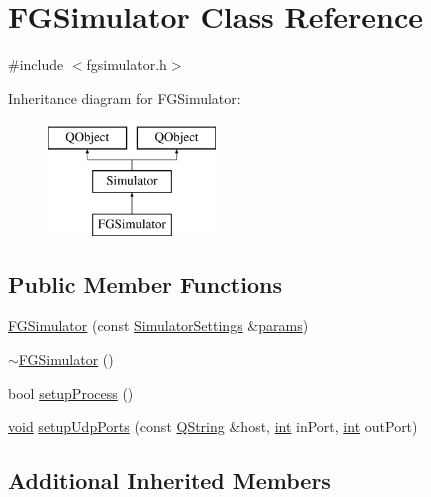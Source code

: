 \hypertarget{class_f_g_simulator}{\section{F\-G\-Simulator Class Reference}
\label{class_f_g_simulator}
}


{\ttfamily \#include $<$fgsimulator.\-h$>$}

Inheritance diagram for F\-G\-Simulator\-:\begin{figure}[H]
\begin{center}
\leavevmode
\includegraphics[height=3.000000cm]{class_f_g_simulator}
\end{center}
\end{figure}
\subsection*{Public Member Functions}
\begin{DoxyCompactItemize}
\item 
\hyperlink{group___h_i_t_l_plugin_gac56390412d899fc09748d050d06a7fab}{F\-G\-Simulator} (const \hyperlink{group___h_i_t_l_plugin_ga052199f1328d3002bce3e45345aa7f4e}{Simulator\-Settings} \&\hyperlink{glext_8h_afeb6390ab3bc8a0e96a88aff34d52288}{params})
\item 
\hyperlink{group___h_i_t_l_plugin_ga379c8b16215b0b40514c3b522fabf816}{$\sim$\-F\-G\-Simulator} ()
\item 
bool \hyperlink{group___h_i_t_l_plugin_ga704da6f44b2b3538b2e1c3239cb2a76c}{setup\-Process} ()
\item 
\hyperlink{group___u_a_v_objects_plugin_ga444cf2ff3f0ecbe028adce838d373f5c}{void} \hyperlink{group___h_i_t_l_plugin_ga806877c20e5dc15efd67bb1c5e4f0710}{setup\-Udp\-Ports} (const \hyperlink{group___u_a_v_objects_plugin_gab9d252f49c333c94a72f97ce3105a32d}{Q\-String} \&host, \hyperlink{ioapi_8h_a787fa3cf048117ba7123753c1e74fcd6}{int} in\-Port, \hyperlink{ioapi_8h_a787fa3cf048117ba7123753c1e74fcd6}{int} out\-Port)
\end{DoxyCompactItemize}
\subsection*{Additional Inherited Members}



